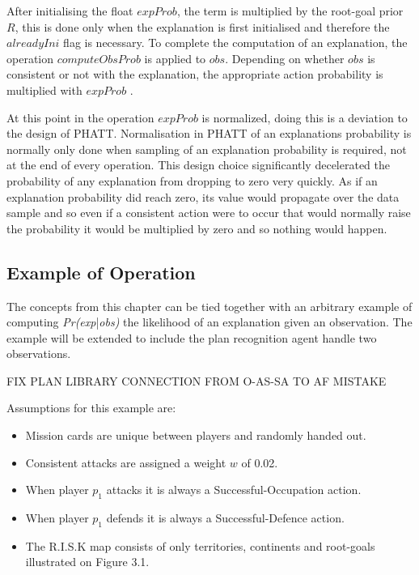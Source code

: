 \documentclass[parskip]{cs4rep}
\begin{document}
After initialising the float $expProb$, the term is multiplied by the root-goal prior $R$, this is done only when the explanation is first initialised and therefore the $alreadyIni$ flag is necessary. To complete the computation of an explanation, the operation $computeObsProb$ is applied to $obs$. Depending on whether $obs$ is consistent or not with the explanation, the appropriate action probability is multiplied with $expProb$ .

At this point in the operation $expProb$ is normalized, doing this is a deviation to the design of PHATT. Normalisation in PHATT of an explanations probability is normally only done when sampling of an explanation probability is required, not at the end of every operation. This design choice significantly decelerated the probability of any explanation from dropping to zero very quickly. As if an explanation probability did reach zero, its value would propagate over the data sample and so even if a consistent action were to occur that would normally raise the probability it would be multiplied by zero and so nothing would happen. 

\subsection{Example of Operation}

The concepts from this chapter can be tied together with an arbitrary example of computing \textit{Pr(exp}|\textit{obs)} the likelihood of an explanation given an observation. The example will be extended to include the plan recognition agent handle two observations.

FIX PLAN LIBRARY CONNECTION FROM O-AS-SA TO AF MISTAKE

Assumptions for this example are:

\begin{itemize}
\item
Mission cards are unique between players and randomly handed out.
\item
Consistent attacks are assigned a weight $w$ of 0.02.
\item
When player $p_1$ attacks it is always a Successful-Occupation action.
\item
When player $p_1$ defends it is always a Successful-Defence action.
\item
The R.I.S.K map consists of only territories, continents and root-goals illustrated on Figure 3.1.
\end{itemize}
\end{document}
